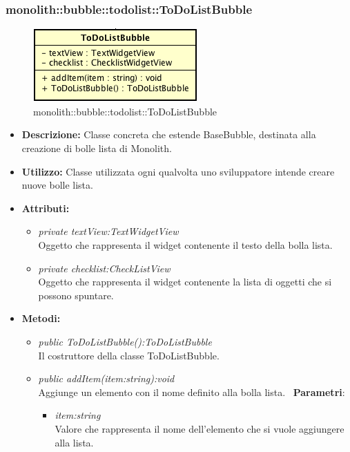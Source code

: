 \subsubsection{monolith::bubble::todolist::ToDoListBubble}

\label{monolith::bubble::todolist::ToDoListBubble}
\begin{figure}[H]
	\centering
	\includegraphics[scale=0.5]{Sezioni/SottosezioniST/img/ToDoListBubble.png}
	\caption{monolith::bubble::todolist::ToDoListBubble}
\end{figure}

\begin{itemize}
\item \textbf{Descrizione:} Classe concreta che estende BaseBubble, destinata alla creazione di bolle lista di Monolith.
\item \textbf{Utilizzo:} Classe utilizzata ogni qualvolta uno sviluppatore intende creare nuove bolle lista.
\item \textbf{Attributi:}
\begin{itemize}
\item \textit{private textView:TextWidgetView}\\
Oggetto che rappresenta il widget contenente il testo della bolla lista.
\item \textit{private checklist:CheckListView}\\
Oggetto che rappresenta il widget contenente la lista di oggetti che si possono spuntare.
\end{itemize}
\item \textbf{Metodi:}
\begin{itemize}
\item \textit{public ToDoListBubble():ToDoListBubble}\\
Il costruttore della classe ToDoListBubble.
\item \textit{public addItem(item:string):void}\\
Aggiunge un elemento con il nome definito alla bolla lista.
\ \textbf{Parametri}: \begin{itemize}
\item \textit{item:string}\\
Valore che rappresenta il nome dell'elemento che si vuole aggiungere alla lista.
\end{itemize}
\end{itemize}
\end{itemize}

